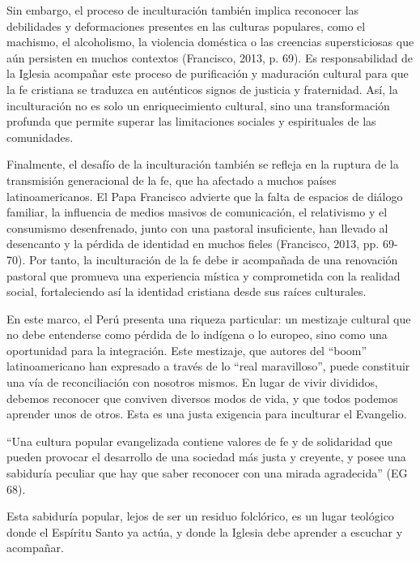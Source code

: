 \documentclass[12pt]{article}
\begin{document}
Sin embargo, el proceso de inculturación también implica reconocer las debilidades y deformaciones presentes en las culturas populares, como el machismo, el alcoholismo, la violencia doméstica o las creencias supersticiosas que aún persisten en muchos contextos (Francisco, 2013, p. 69). Es responsabilidad de la Iglesia acompañar este proceso de purificación y maduración cultural para que la fe cristiana se traduzca en auténticos signos de justicia y fraternidad. Así, la inculturación no es solo un enriquecimiento cultural, sino una transformación profunda que permite superar las limitaciones sociales y espirituales de las comunidades.

Finalmente, el desafío de la inculturación también se refleja en la ruptura de la transmisión generacional de la fe, que ha afectado a muchos países latinoamericanos. El Papa Francisco advierte que la falta de espacios de diálogo familiar, la influencia de medios masivos de comunicación, el relativismo y el consumismo desenfrenado, junto con una pastoral insuficiente, han llevado al desencanto y la pérdida de identidad en muchos fieles (Francisco, 2013, pp. 69-70). Por tanto, la inculturación de la fe debe ir acompañada de una renovación pastoral que promueva una experiencia mística y comprometida con la realidad social, fortaleciendo así la identidad cristiana desde sus raíces culturales.

En este marco, el Perú presenta una riqueza particular: un mestizaje cultural que no debe entenderse como pérdida de lo indígena o lo europeo, sino como una oportunidad para la integración. Este mestizaje, que autores del “boom” latinoamericano han expresado a través de lo “real maravilloso”, puede constituir una vía de reconciliación con nosotros mismos. En lugar de vivir divididos, debemos reconocer que conviven diversos modos de vida, y que todos podemos aprender unos de otros. Esta es una justa exigencia para inculturar el Evangelio.

\begin{displayquote}
	“Una cultura popular evangelizada contiene valores de fe y de solidaridad que pueden provocar el desarrollo de una sociedad más justa y creyente, y posee una sabiduría peculiar que hay que saber reconocer con una mirada agradecida” (EG 68).
\end{displayquote}

Esta sabiduría popular, lejos de ser un residuo folclórico, es un lugar teológico donde el Espíritu Santo ya actúa, y donde la Iglesia debe aprender a escuchar y acompañar.
\end{document}
